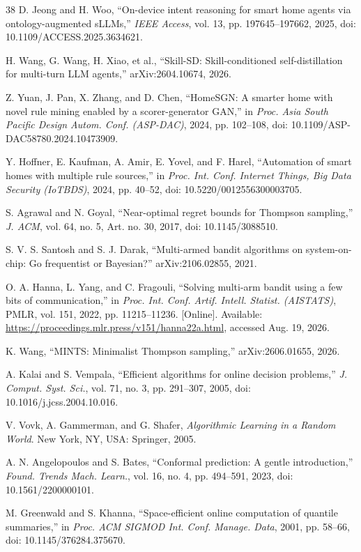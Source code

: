 \documentclass[review]{elsarticle}
\begin{document}
\begin{thebibliography}{38}
 D. Jeong and H. Woo, ``On-device intent reasoning for smart home
agents via ontology-augmented sLLMs,'' \emph{IEEE Access}, vol. 13, pp.
197645--197662, 2025, doi: 10.1109/ACCESS.2025.3634621.

 H. Wang, G. Wang, H. Xiao, et al., ``Skill-SD:
Skill-conditioned self-distillation for multi-turn LLM agents,''
arXiv:2604.10674, 2026.

 Z. Yuan, J. Pan, X. Zhang, and D. Chen, ``HomeSGN: A smarter
home with novel rule mining enabled by a scorer-generator GAN,'' in
\emph{Proc. Asia South Pacific Design Autom. Conf. (ASP-DAC)}, 2024, pp.
102--108, doi: 10.1109/ASP-DAC58780.2024.10473909.

 Y. Hoffner, E. Kaufman, A. Amir, E. Yovel, and F. Harel,
``Automation of smart homes with multiple rule sources,'' in \emph{Proc. Int.
Conf. Internet Things, Big Data Security (IoTBDS)}, 2024, pp. 40--52, doi:
10.5220/0012556300003705.

 S. Agrawal and N. Goyal, ``Near-optimal regret bounds for
Thompson sampling,'' \emph{J. ACM}, vol. 64, no. 5, Art. no. 30, 2017, doi:
10.1145/3088510.

 S. V. S. Santosh and S. J. Darak, ``Multi-armed bandit
algorithms on system-on-chip: Go frequentist or Bayesian?''
arXiv:2106.02855, 2021.

 O. A. Hanna, L. Yang, and C. Fragouli, ``Solving multi-arm
bandit using a few bits of communication,'' in \emph{Proc. Int. Conf. Artif.
Intell. Statist. (AISTATS)}, PMLR, vol. 151, 2022, pp. 11215--11236.
[Online]. Available:
\url{https://proceedings.mlr.press/v151/hanna22a.html}, accessed Aug. 19,
2026.

 K. Wang, ``MINTS: Minimalist Thompson sampling,'' arXiv:2606.01655,
2026.

 A. Kalai and S. Vempala, ``Efficient algorithms for online
decision problems,'' \emph{J. Comput. Syst. Sci.}, vol. 71, no. 3, pp.
291--307, 2005, doi: 10.1016/j.jcss.2004.10.016.

 V. Vovk, A. Gammerman, and G. Shafer, \emph{Algorithmic Learning
in a Random World}. New York, NY, USA: Springer, 2005.

 A. N. Angelopoulos and S. Bates, ``Conformal prediction: A
gentle introduction,'' \emph{Found. Trends Mach. Learn.}, vol. 16, no. 4, pp.
494--591, 2023, doi: 10.1561/2200000101.

 M. Greenwald and S. Khanna, ``Space-efficient online computation
of quantile summaries,'' in \emph{Proc. ACM SIGMOD Int. Conf. Manage. Data},
2001, pp. 58--66, doi: 10.1145/376284.375670.


\end{thebibliography}
\end{document}

